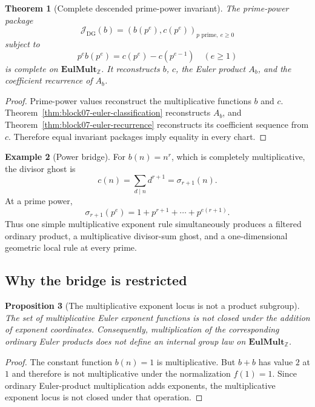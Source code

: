 \documentclass[11pt]{article}
\newtheorem{theorem}{Theorem}[section]
\newtheorem{proposition}[theorem]{Proposition}
\theoremstyle{definition}
\newtheorem{example}[theorem]{Example}
\theoremstyle{remark}
\begin{document}
\begin{theorem}[Complete descended prime-power invariant]
\label{thm:block07-complete-product-invariant}
The prime-power package
\[
\boxed{
\mathcal J_{\mathrm{DG}}(b)
=
\left(
 b(p^e),
 c(p^e)
\right)_{p\text{ prime},\ e\geq0}
}
\]
subject to
\[
p^e b(p^e)=c(p^e)-c(p^{e-1})
\quad(e\geq1)
\]
is complete on $\mathbf{EulMult}_{\mathbb Z}$.  It reconstructs $b$, $c$, the Euler product $A_b$, and the coefficient recurrence of $A_b$.
\end{theorem}

\begin{proof}
Prime-power values reconstruct the multiplicative functions $b$ and $c$.  Theorem~\ref{thm:block07-euler-classification} reconstructs $A_b$, and Theorem~\ref{thm:block07-euler-recurrence} reconstructs its coefficient sequence from $c$.  Therefore equal invariant packages imply equality in every chart.
\end{proof}

\begin{example}[Power bridge]
For $b(n)=n^r$, which is completely multiplicative, the divisor ghost is
\[
c(n)=\sum_{d\mid n}d^{r+1}=\sigma_{r+1}(n).
\]
At a prime power,
\[
\sigma_{r+1}(p^e)
=
1+p^{r+1}+\cdots+p^{e(r+1)}.
\]
Thus one simple multiplicative exponent rule simultaneously produces a filtered ordinary product, a multiplicative divisor-sum ghost, and a one-dimensional geometric local rule at every prime.
\end{example}

\subsection{Why the bridge is restricted}

\begin{proposition}[The multiplicative exponent locus is not a product subgroup]
The set of multiplicative Euler exponent functions is not closed under the addition of exponent coordinates.  Consequently, multiplication of the corresponding ordinary Euler products does not define an internal group law on $\mathbf{EulMult}_{\mathbb Z}$.
\end{proposition}

\begin{proof}
The constant function $b(n)=1$ is multiplicative.  But $b+b$ has value $2$ at $1$ and therefore is not multiplicative under the normalization $f(1)=1$.  Since ordinary Euler-product multiplication adds exponents, the multiplicative exponent locus is not closed under that operation.
\end{proof}
\end{document}
